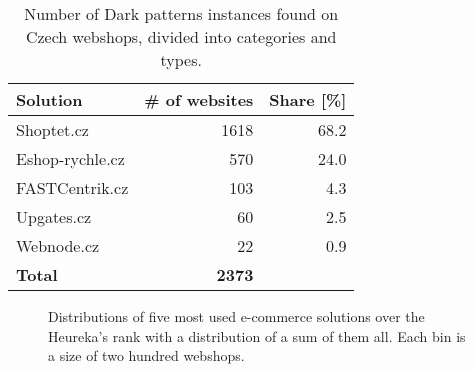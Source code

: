 \begin{table}[h!]
    \centering
    \bgroup
    \def\arraystretch{1.65}
        \begin{tabular}{l|r|r}
            \toprule
            \textbf{Solution}    & \multicolumn{1}{l}{\textbf{\# of websites}}  & \multicolumn{1}{l}{\textbf{Share [\%]}} \\ \hline
            Shoptet.cz           & 1618                                         &  68.2                                  \\
            Eshop-rychle.cz      & 570                                          &  24.0                                  \\
            FASTCentrik.cz       & 103                                          &  4.3                                   \\
            Upgates.cz           & 60                                           &  2.5                                   \\
            Webnode.cz           & 22                                           &  0.9                                   \\ \hline
            \textbf{Total}       & \textbf{2373}
        \end{tabular}
    \egroup
    \caption{Number of Dark patterns instances found on Czech webshops, divided into categories and types.}
    \label{table:ecommerce-solutions}
\end{table}

\begin{figure}
    \begin{center}
        
    \end{center}
    \caption{Distributions of five most used e-commerce solutions over the Heureka's rank with a distribution of a sum of them all. Each bin is a size of two hundred webshops.}
    \label{fig:ecommerce-solutions-histograms}
\end{figure}

